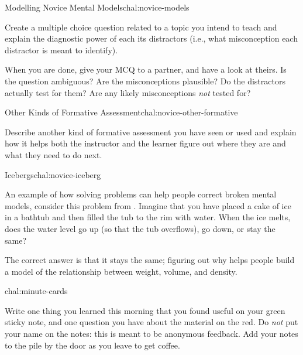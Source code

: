 \begin{challenge}{Modelling Novice Mental Models}{chal:novice-models}

Create a multiple choice question related to a topic you intend to teach
and explain the diagnostic power of each its distractors (i.e., what
misconception each distractor is meant to identify).

When you are done, give your MCQ to a partner, and have a look at
theirs.  Is the question ambiguous?  Are the misconceptions plausible?
Do the distractors actually test for them?  Are any likely
misconceptions \emph{not} tested for?

\end{challenge}

\begin{challenge}{Other Kinds of Formative Assessment}{chal:novice-other-formative}

Describe another kind of formative assessment you have seen or used and
explain how it helps both the instructor and the learner figure out
where they are and what they need to do next.

\end{challenge}

\begin{challenge}{Icebergs}{chal:novice-iceberg}

An example of how solving problems can help people correct broken
mental models, consider this problem from \cite{epstein}. Imagine that
you have placed a cake of ice in a bathtub and then filled the tub to
the rim with water. When the ice melts, does the water level go up (so
that the tub overflows), go down, or stay the same?


The correct answer is that it stays the same; figuring out why helps
people build a model of the relationship between weight, volume, and
density.

\end{challenge}

\begin{challenge}{chal:minute-cards}

Write one thing you learned this morning that you found useful on your
green sticky note, and one question you have about the material on the
red. Do \emph{not} put your name on the notes: this is meant to be
anonymous feedback. Add your notes to the pile by the door as you leave
to get coffee.

\end{challenge}
